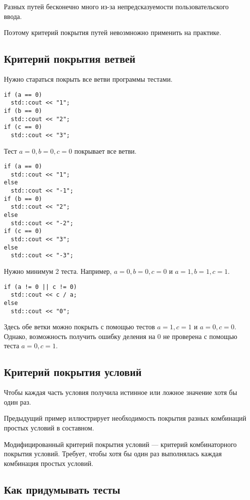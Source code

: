 \documentclass[14pt,openany]{book}
\begin{document}
Разных путей бесконечно много из-за непредсказуемости пользовательского ввода.

Поэтому критерий покрытия путей невозмножно применить на практике.

\subsection{Критерий покрытия ветвей}

Нужно стараться покрыть все ветви программы тестами.

\begin{lstlisting}
if (a == 0)
  std::cout << "1";
if (b == 0)
  std::cout << "2";
if (c == 0)
  std::cout << "3";
\end{lstlisting}

Тест $a=0, b=0, c=0$ покрывает все ветви.


\begin{lstlisting}
if (a == 0)
  std::cout << "1";
else
  std::cout << "-1";
if (b == 0)
  std::cout << "2";
else
  std::cout << "-2";
if (c == 0)
  std::cout << "3";
else
  std::cout << "-3";
\end{lstlisting}

Нужно минимум 2 теста. Например, $a=0, b=0, c=0$ и $a=1, b=1, c=1$.

\begin{lstlisting}
if (a != 0 || c != 0)
  std::cout << c / a;
else
  std::cout << "0";
\end{lstlisting}

Здесь обе ветки можно покрыть с помощью тестов $a=1, c=1$ и $a=0, c=0$.
Однако, возможность получить ошибку деления на $0$ не проверена с помощью
теста $a=0, c=1$.

\subsection{Критерий покрытия условий}

Чтобы каждая часть условия получила истинное или ложное
значение хотя бы один раз.

Предыдущий пример иллюстрирует необходимость покрытия разных комбинаций простых
условий в составном.

Модифицированный критерий покрытия условий --- критерий комбинаторного покрытия условий.
Требует, чтобы хотя бы один раз выполнялась каждая комбинация простых условий.

\subsection{Как придумывать тесты}
\end{document}
